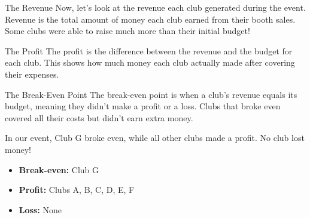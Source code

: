 \documentclass[12pt]{beamer}
\begin{document}
\begin{frame}{The Revenue}
    Now, let's look at the revenue each club generated during the event. Revenue is the total amount of money each club earned from their booth sales. Some clubs were able to raise much more than their initial budget!
    \vfill
    \begin{center}
    \end{center}
\end{frame}
\begin{frame}{The Profit}
    The profit is the difference between the revenue and the budget for each club. This shows how much money each club actually made after covering their expenses.
    
    \vfill
    \begin{center}
    \end{center}
\end{frame}
\begin{frame}{The Break-Even Point}
    The break-even point is when a club's revenue equals its budget, meaning they didn't make a profit or a loss. Clubs that broke even covered all their costs but didn't earn extra money.

    In our event, Club G broke even, while all other clubs made a profit. No club lost money!

    \begin{itemize}
        \item \textbf{Break-even:} Club G
        \item \textbf{Profit:} Clubs A, B, C, D, E, F
        \item \textbf{Loss:} None
    \end{itemize}
\end{frame}
\end{document}
